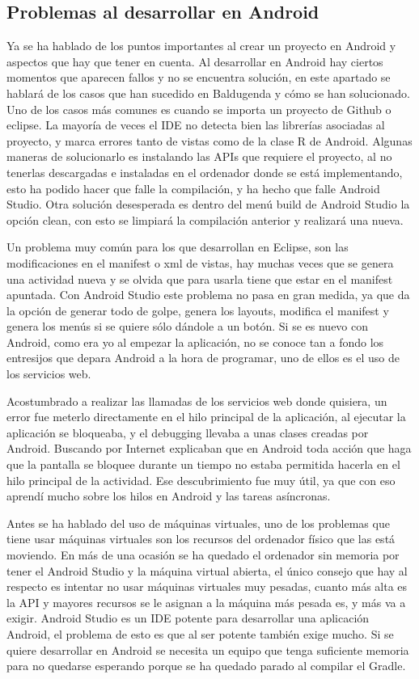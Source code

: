 \subsection{Problemas al desarrollar en Android}
\label{subsecc:Problemas al desarrollar en Android}

Ya se ha hablado de los puntos importantes al crear un proyecto en Android y aspectos que hay que tener en cuenta.
Al desarrollar en Android hay ciertos momentos que aparecen fallos y no se encuentra solución, en este apartado se hablará de los casos que han sucedido en Baldugenda y cómo se han solucionado.
Uno de los casos más comunes es cuando se importa un proyecto de Github o eclipse. La mayoría de veces el IDE no detecta bien las librerías asociadas al proyecto, y marca errores tanto de vistas como de la clase R de Android.
Algunas maneras de solucionarlo es instalando las APIs que requiere el proyecto, al no tenerlas descargadas e instaladas en el ordenador donde se está implementando, esto ha podido hacer que falle la compilación, y ha hecho que falle Android Studio.
Otra solución desesperada es dentro del menú build de Android Studio la opción clean, con esto se limpiará la compilación anterior y realizará una nueva.

Un problema muy común para los que desarrollan en Eclipse, son las modificaciones en el manifest o xml de vistas, hay muchas veces que se genera una actividad nueva y se olvida que para usarla tiene que estar en el manifest apuntada.
Con Android Studio este problema no pasa en gran medida, ya que da la opción de generar todo de golpe, genera los layouts, modifica el manifest y genera los menús si se quiere sólo dándole a un botón.
Si se es nuevo con Android, como era yo al empezar la aplicación, no se conoce tan a fondo los entresijos  que depara Android a la hora de programar, uno de ellos es el uso de los servicios web.

Acostumbrado a realizar las llamadas de los servicios web donde quisiera, un error fue meterlo directamente en el hilo principal de la aplicación, al ejecutar la aplicación se bloqueaba, y el debugging llevaba a unas clases creadas por Android.
Buscando por Internet explicaban que en Android toda acción que haga que la pantalla se bloquee durante un tiempo no estaba permitida hacerla en el hilo principal de la actividad.
Ese descubrimiento fue muy útil, ya que con eso aprendí  mucho sobre los hilos en Android y las tareas asíncronas.

Antes se ha hablado del uso de máquinas virtuales, uno de los problemas que tiene usar máquinas virtuales son los recursos del ordenador físico que las está moviendo. En más de una ocasión se ha quedado el ordenador sin memoria por tener el Android Studio y la máquina virtual abierta, el único consejo que hay al respecto es intentar no usar máquinas virtuales muy pesadas, cuanto más alta es la API y mayores recursos se le asignan a la máquina más pesada es, y más va a exigir.
Android Studio es un IDE potente para desarrollar una aplicación Android, el problema de esto es que al ser potente también exige mucho. Si se quiere desarrollar en Android se necesita un equipo que tenga suficiente memoria para no quedarse esperando porque se ha quedado parado al compilar el Gradle.

